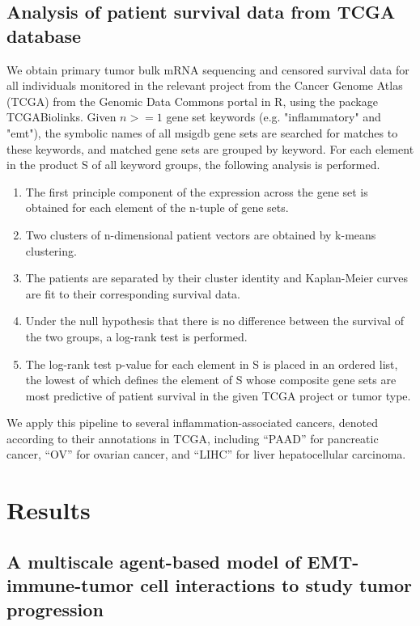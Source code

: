 \documentclass[11pt]{article}
\begin{document}
\subsection{Analysis of patient survival data from TCGA database}
We obtain primary tumor bulk mRNA sequencing and censored survival data for all individuals monitored in the relevant project from the Cancer Genome Atlas (TCGA) from the Genomic Data Commons portal in R, using the package TCGABiolinks.  Given $n >= 1$ gene set keywords (e.g. "inflammatory" and "emt"), the symbolic names of all msigdb gene sets are searched for matches to these keywords, and matched gene sets are grouped by keyword. For each element in the product S of all keyword groups, the following analysis is performed.
\begin{enumerate}
     \item The first principle component of the expression across the gene set is obtained for each element of the n-tuple of gene sets.
     \item Two clusters of n-dimensional patient vectors are obtained by k-means clustering.
     \item The patients are separated by their cluster identity and Kaplan-Meier curves are fit to their corresponding survival data.
     \item Under the null hypothesis that there is no difference between the survival of the two groups, a log-rank test is performed.
     \item The log-rank test p-value for each element in S is placed in an ordered list, the lowest of which defines the element of S whose composite gene sets are most predictive of patient survival in the given TCGA project or tumor type.
\end{enumerate}
We apply this pipeline to several inflammation-associated cancers, denoted according to their annotations in TCGA, including ``PAAD'' for pancreatic cancer, ``OV'' for ovarian cancer, and ``LIHC'' for liver hepatocellular carcinoma.




\section{Results}

\subsection{A multiscale agent-based model of EMT-immune-tumor cell interactions to study tumor progression}\label{ExplModel}
\end{document}
